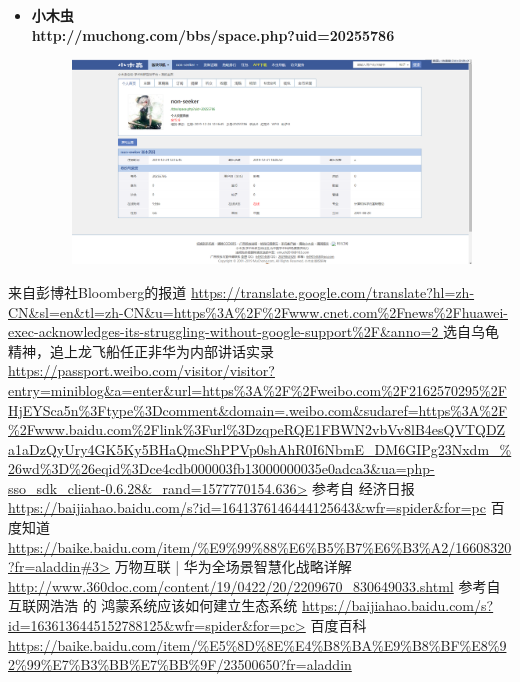 \documentclass{article}
\begin{document}
\begin{itemize}
{\begin{figure}[h]
            \label{fig:1.7.1}
        \end{figure}
    }
    \item {
        \bf{小木虫}\\
        http://muchong.com/bbs/space.php?uid=20255786\\
        \begin{figure}[h]
            \centering
            \includegraphics[scale=0.2]{1.8.1}
            \label{fig:1.8.1}
        \end{figure}
    }
\end{itemize}

\newpage



\begin{thebibliography}{99}  
     来自彭博社Bloomberg的报道 \url{https://translate.google.com/translate?hl=zh-CN\&sl=en\&tl=zh-CN\&u=https\%3A\%2F\%2Fwww.cnet.com\%2Fnews\%2Fhuawei-exec-acknowledges-its-struggling-without-google-support\%2F\&anno=2 }
     选自乌龟精神，追上龙飞船{任正非华为内部讲话实录} \url{https://passport.weibo.com/visitor/visitor?entry=miniblog\&a=enter\&url=https\%3A\%2F\%2Fweibo.com\%2F2162570295\%2FHjEYSca5n\%3Ftype\%3Dcomment\&domain=.weibo.com\&sudaref=https\%3A\%2F\%2Fwww.baidu.com\%2Flink\%3Furl\%3DzqpeRQE1FBWN2vbVv8lB4esQVTQDZa1aDzQyUry4GK5Ky5BHaQmcShPPVp0shAhR0I6NbmE_DM6GIPg23Nxdm_\%26wd\%3D\%26eqid\%3Dce4cdb000003fb13000000035e0adca3\&ua=php-sso_sdk_client-0.6.28\&_rand=1577770154.636>}
     参考自 经济日报 \url{https://baijiahao.baidu.com/s?id=1641376146444125643&wfr=spider&for=pc}
     百度知道 \url{https://baike.baidu.com/item/\%E9\%99\%88\%E6\%B5\%B7\%E6\%B3\%A2/16608320?fr=aladdin\#3>}
     万物互联 | 华为全场景智慧化战略详解  \url{http://www.360doc.com/content/19/0422/20/2209670_830649033.shtml}
     参考自 互联网浩浩 的 鸿蒙系统应该如何建立生态系统  \url{https://baijiahao.baidu.com/s?id=1636136445152788125\&wfr=spider\&for=pc>}
     百度百科 \url{https://baike.baidu.com/item/\%E5\%8D\%8E\%E4\%B8\%BA\%E9\%B8\%BF\%E8\%92\%99\%E7\%B3\%BB\%E7\%BB\%9F/23500650?fr=aladdin}
\end{thebibliography}
\end{document}
